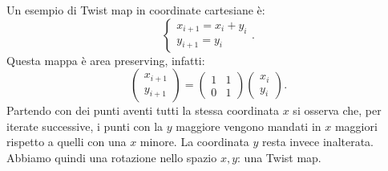 \noindent
\begin{exmp}
    Un esempio di Twist map in coordinate cartesiane è:
    \[
        \begin{cases}
            x_{i+1}=x_i+y_i\\
	    y_{i+1}=y_i
        \end{cases}
    .\] 
    Questa mappa è area preserving, infatti:
    \[
        \begin{pmatrix} x_{i+1} \\ y_{i+1} \end{pmatrix} =
	\begin{pmatrix} 
	    1 & 1 \\
	    0 & 1
	\end{pmatrix} 
	\begin{pmatrix} x_i \\ y_i \end{pmatrix} 
    .\] 
    Partendo con dei punti aventi tutti la stessa coordinata $x$ si osserva che, per iterate successive, i punti con la $y$ maggiore vengono mandati in $x$ maggiori rispetto a quelli con una $x$ minore. La coordinata $y$ resta invece inalterata.\\
    Abbiamo quindi una rotazione nello spazio $x,y$: una Twist map.
\end{exmp}
\noindent
